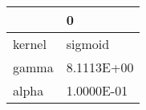 \begin{tabular}{ll}
\toprule
{} &          0 \\
\midrule
kernel &    sigmoid \\
gamma  & 8.1113E+00 \\
alpha  & 1.0000E-01 \\
\bottomrule
\end{tabular}
